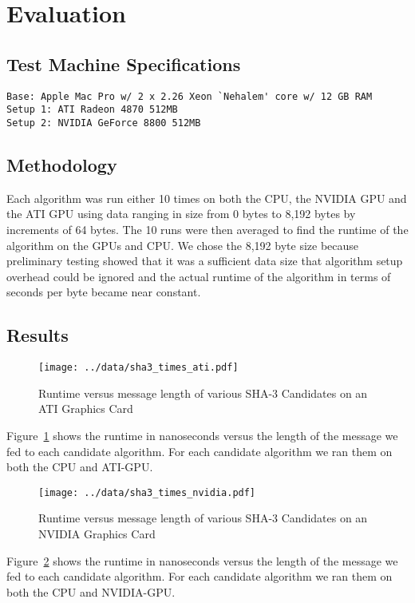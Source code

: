 \section*{Evaluation}

\subsection*{Test Machine Specifications}
\begin{verbatim}
Base: Apple Mac Pro w/ 2 x 2.26 Xeon `Nehalem' core w/ 12 GB RAM
Setup 1: ATI Radeon 4870 512MB
Setup 2: NVIDIA GeForce 8800 512MB
\end{verbatim}

\subsection*{Methodology}
Each algorithm was run either 10 times on both the CPU, the NVIDIA GPU and the ATI GPU using data ranging in size from 0 bytes to 8,192 bytes by increments of 64 bytes.
The 10 runs were then averaged to find the runtime of the algorithm on the GPUs and CPU.
We chose the 8,192 byte size because preliminary testing showed that it was a sufficient data size that algorithm setup overhead could be ignored and the actual runtime of the algorithm in terms of seconds per byte became near constant.

\subsection*{Results}

\begin{figure}[htp]
\texttt{[image: ../data/sha3\_times\_ati.pdf]}
\caption{Runtime versus message length of various SHA-3 Candidates on an ATI Graphics Card}\label{fig:sha3_times_ati}
\end{figure}

Figure~\ref{fig:sha3_times_ati} shows the runtime in nanoseconds versus the length of the message we fed to each candidate algorithm. For each candidate algorithm we ran them on both the CPU and ATI-GPU.

\begin{figure}[htp]
\texttt{[image: ../data/sha3\_times\_nvidia.pdf]}
\caption{Runtime versus message length of various SHA-3 Candidates on an NVIDIA Graphics Card}\label{fig:sha3_times_nvidia}
\end{figure}

Figure~\ref{fig:sha3_times_nvidia} shows the runtime in nanoseconds versus the length of the message we fed to each candidate algorithm. For each candidate algorithm we ran them on both the CPU and NVIDIA-GPU.

